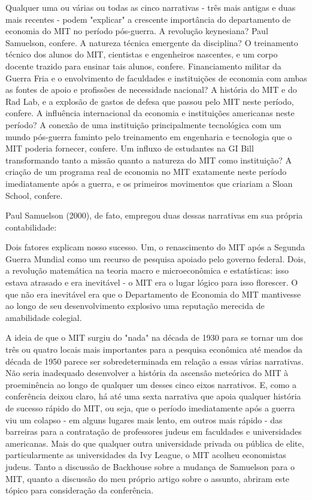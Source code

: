 \documentclass[12pt]{article}
\begin{document}
Qualquer uma ou várias ou todas as cinco narrativas - três mais antigas e duas mais recentes - podem "explicar" a crescente importância do departamento de economia do MIT no período pós-guerra. A revolução keynesiana? Paul Samuelson, confere. A natureza técnica emergente da disciplina? O treinamento técnico dos alunos do MIT, cientistas e engenheiros nascentes, e um corpo docente trazido para ensinar tais alunos, confere. Financiamento militar da Guerra Fria e o envolvimento de faculdades e instituições de economia com ambas as fontes de apoio e profissões de necessidade nacional? A história do MIT e do Rad Lab, e a explosão de gastos de defesa que passou pelo MIT neste período, confere. A influência internacional da economia e instituições americanas neste período? A conexão de uma instituição principalmente tecnológica com um mundo pós-guerra faminto pelo treinamento em engenharia e tecnologia que o MIT poderia fornecer, confere. Um influxo de estudantes na GI Bill transformando tanto a missão quanto a natureza do MIT como instituição? A criação de um programa real de economia no MIT exatamente neste período imediatamente após a guerra, e os primeiros movimentos que criariam a Sloan School, confere.

Paul Samuelson (2000), de fato, empregou duas dessas narrativas em sua própria contabilidade:

Dois fatores explicam nosso sucesso. Um, o renascimento do MIT após a Segunda Guerra Mundial como um recurso de pesquisa apoiado pelo governo federal. Dois, a revolução matemática na teoria macro e microeconômica e estatísticas: isso estava atrasado e era inevitável - o MIT era o lugar lógico para isso florescer. O que não era inevitável era que o Departamento de Economia do MIT mantivesse ao longo de seu desenvolvimento explosivo uma reputação merecida de amabilidade colegial.

A ideia de que o MIT surgiu do "nada" na década de 1930 para se tornar um dos três ou quatro locais mais importantes para a pesquisa econômica até meados da década de 1950 parece ser sobredeterminada em relação a essas várias narrativas. Não seria inadequado desenvolver a história da ascensão meteórica do MIT à proeminência ao longo de qualquer um desses cinco eixos narrativos. E, como a conferência deixou claro, há até uma sexta narrativa que apoia qualquer história de sucesso rápido do MIT, ou seja, que o período imediatamente após a guerra viu um colapso - em alguns lugares mais lento, em outros mais rápido - das barreiras para a contratação de professores judeus em faculdades e universidades americanas. Mais do que qualquer outra universidade privada ou pública de elite, particularmente as universidades da Ivy League, o MIT acolheu economistas judeus. Tanto a discussão de Backhouse sobre a mudança de Samuelson para o MIT, quanto a discussão do meu próprio artigo sobre o assunto, abriram este tópico para consideração da conferência.
\end{document}
